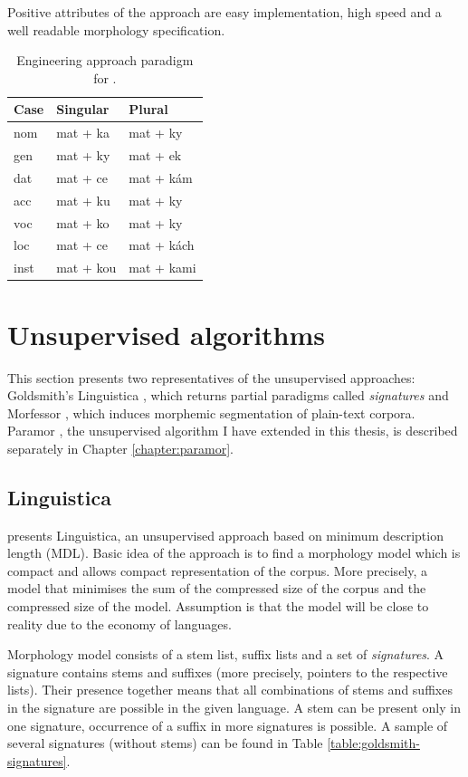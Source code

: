 Positive attributes of the approach are easy implementation, high speed and a well readable morphology specification.

\begin{table}[htb]
\begin{center}
\begin{tabular}{lll}
\toprule \bf Case & \bf Singular & \bf Plural \\ \midrule
nom & mat + ka &  mat + ky \\
gen & mat + ky &  mat + ek \\
dat & mat + ce &  mat + kám\\
acc & mat + ku &  mat + ky \\
voc & mat + ko &  mat + ky \\
loc & mat + ce &  mat + kách \\
inst & mat + kou & mat + kami \\
\bottomrule
\end{tabular}
\end{center}
\caption{\label{table:matka_eng} Engineering approach paradigm for .}
\end{table}

\section{Unsupervised algorithms}
This section presents two representatives of the unsupervised approaches: Goldsmith's Linguistica \citep{goldsmith01}, which returns partial paradigms called \emph{signatures} and Morfessor \citep{creutz-lagus-2002, creutz-lagus-2005, creutz07}, which induces morphemic segmentation of plain-text corpora. Paramor \citep{monson09}, the unsupervised algorithm I have extended in this thesis, is described separately in Chapter \ref{chapter:paramor}.

\subsection{Linguistica}
\cite{goldsmith01} presents Linguistica, an unsupervised approach based on minimum description length (MDL). Basic idea of the approach is to find a morphology model which is compact and allows compact representation of the corpus. More precisely, a model that minimises the sum of the compressed size of the corpus and the compressed size of the model. Assumption is that the model will be close to reality due to the economy of languages. 

Morphology model consists of a stem list, suffix lists and a set of \emph{signatures}. A signature contains stems and suffixes (more precisely, pointers to the respective lists). Their presence together means that all combinations of stems and suffixes in the signature are possible in the given language. A stem can be present only in one signature, occurrence of a suffix in more signatures is possible. A sample of several signatures (without stems) can be found in Table \ref{table:goldsmith-signatures}.

